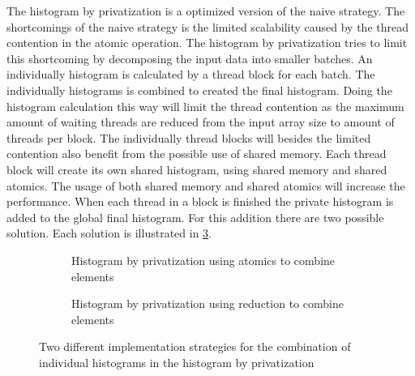 The histogram by privatization is a optimized version of the naive strategy. The shortcomings of the naive strategy is the limited scalability caused by the thread contention in the atomic operation. The histogram by privatization tries to limit this shortcoming by decomposing the input data into smaller batches. An individually histogram is calculated by a thread block for each batch. The individually histograms is combined to created the final histogram. Doing the histogram calculation this way will limit the thread contention as the maximum amount of waiting threads are reduced from the input array size to amount of threads per block.
The individually thread blocks will besides the limited contention also benefit from the possible use of shared memory. Each thread block will create its own shared histogram, using shared memory and shared atomics. The usage of both shared memory and shared atomics will increase the performance. When each thread in a block is finished the private histogram is added to the global final histogram. For this addition there are two possible solution. Each solution is illustrated in \cref{fig:hist_privat}. 

\begin{figure}[ht]
	\centering
	\begin{subfigure}{0.9\textwidth}
		\centering
		\caption{Histogram by privatization using atomics to combine elements}
		\label{fig:hist_privat_atomic}
	\end{subfigure}
	\begin{subfigure}{.9\textwidth}
		\centering
		\caption{Histogram by privatization using reduction to combine elements}
		\label{fig:hist_privat_reduce}
	\end{subfigure}
	\caption{Two different implementation strategies for the combination of individual histograms in the histogram by privatization}
	\label{fig:hist_privat}
\end{figure} 

